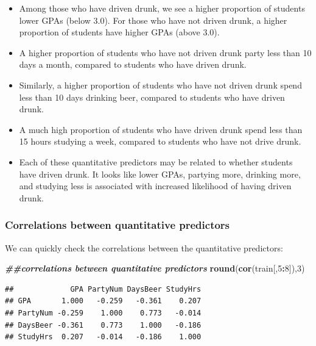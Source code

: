 \documentclass[
]{book}
\newenvironment{Shaded}{\begin{snugshade}}{\end{snugshade}}
\newcommand{\DecValTok}[1]{\textcolor[rgb]{0.00,0.00,0.81}{#1}}
\newcommand{\DocumentationTok}[1]{\textcolor[rgb]{0.56,0.35,0.01}{\textbf{\textit{#1}}}}
\newcommand{\FunctionTok}[1]{\textcolor[rgb]{0.13,0.29,0.53}{\textbf{#1}}}
\newcommand{\NormalTok}[1]{#1}
\newcommand{\SpecialCharTok}[1]{\textcolor[rgb]{0.81,0.36,0.00}{\textbf{#1}}}
\providecommand{\tightlist}{%
  \setlength{\itemsep}{0pt}\setlength{\parskip}{0pt}}
\begin{document}
\begin{itemize}
\tightlist
\item
  Among those who have driven drunk, we see a higher proportion of students lower GPAs (below 3.0). For those who have not driven drunk, a higher proportion of students have higher GPAs (above 3.0).
\item
  A higher proportion of students who have not driven drunk party less than 10 days a month, compared to students who have driven drunk.
\item
  Similarly, a higher proportion of students who have not driven drunk spend less than 10 days drinking beer, compared to students who have driven drunk.
\item
  A much high proportion of students who have driven drunk spend less than 15 hours studying a week, compared to students who have not drive drunk.
\item
  Each of these quantitative predictors may be related to whether students have driven drunk. It looks like lower GPAs, partying more, drinking more, and studying less is associated with increased likelihood of having driven drunk.
\end{itemize}

\hypertarget{correlations-between-quantitative-predictors}{%
\subsubsection*{Correlations between quantitative predictors}\label{correlations-between-quantitative-predictors}}

We can quickly check the correlations between the quantitative predictors:

\begin{Shaded}
\begin{Highlighting}[]
\DocumentationTok{\#\#correlations between quantitative predictors}
\FunctionTok{round}\NormalTok{(}\FunctionTok{cor}\NormalTok{(train[,}\DecValTok{5}\SpecialCharTok{:}\DecValTok{8}\NormalTok{]),}\DecValTok{3}\NormalTok{)}
\end{Highlighting}
\end{Shaded}

\begin{verbatim}
##             GPA PartyNum DaysBeer StudyHrs
## GPA       1.000   -0.259   -0.361    0.207
## PartyNum -0.259    1.000    0.773   -0.014
## DaysBeer -0.361    0.773    1.000   -0.186
## StudyHrs  0.207   -0.014   -0.186    1.000
\end{verbatim}
\end{document}
